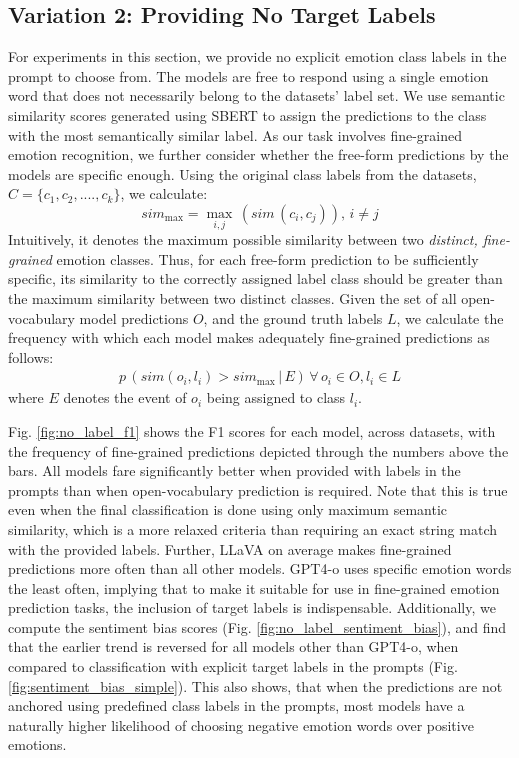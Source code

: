 \subsection{Variation 2: Providing No Target Labels}
\label{sec:no_label}

For experiments in this section, we provide no explicit emotion class labels in the prompt to choose from. The models are free to respond using a single emotion word that does not necessarily belong to the datasets' label set. We use semantic similarity scores generated using SBERT \cite{reimers2019sentencebert} to assign the predictions to the class with the most semantically similar label. As our task involves fine-grained emotion recognition, we further consider whether the free-form predictions by the models are specific enough. Using the original class labels from the datasets, \(C = \{c_1, c_2, ...., c_k\}\), we calculate: 
\begin{equation}
\label{eq:maximum_similarity_distinct}
    sim_{\text{max}} = \max_{i,j}\, (sim\,(c_i, c_j)),\, i \neq j 
\end{equation}
Intuitively, it denotes the maximum possible similarity between two \textit{distinct, fine-grained} emotion classes. Thus, for each free-form prediction to be sufficiently specific, its similarity to the correctly assigned label class should be greater than the maximum similarity between two distinct classes. Given the set of all open-vocabulary model predictions \(O\), and the ground truth labels \(L\), we calculate the frequency with which each model makes adequately fine-grained predictions as follows: 
\begin{multline}
    p\,(sim(o_i, l_i) > sim_{\text{max}}\, |\, E) \, \forall\, o_i \in O, l_i \in L        
\end{multline}
where \(E\) denotes the event of \(o_i\) being assigned to class \(l_i\).

Fig. \ref{fig:no_label_f1} shows the F1 scores for each model, across datasets, with the frequency of fine-grained predictions depicted through the numbers above the bars. All models fare significantly better when provided with labels in the prompts than when open-vocabulary prediction is required. Note that this is true even when the final classification is done using only maximum semantic similarity, which is a more relaxed criteria than requiring an exact string  match with the provided labels. Further, LLaVA on average makes fine-grained predictions more often than all other models. GPT4-o uses specific emotion words the least often, implying that to make it suitable for use in fine-grained emotion prediction tasks, the inclusion of target labels is indispensable. 
Additionally, we compute the sentiment bias scores (Fig. \ref{fig:no_label_sentiment_bias}), and find that the earlier trend is reversed for all models other than GPT4-o, when compared to classification with explicit target labels in the prompts (Fig. \ref{fig:sentiment_bias_simple}). This also shows, that when the predictions are not anchored using predefined class labels in the prompts, most models have a naturally higher likelihood of choosing negative emotion words over positive emotions. 


